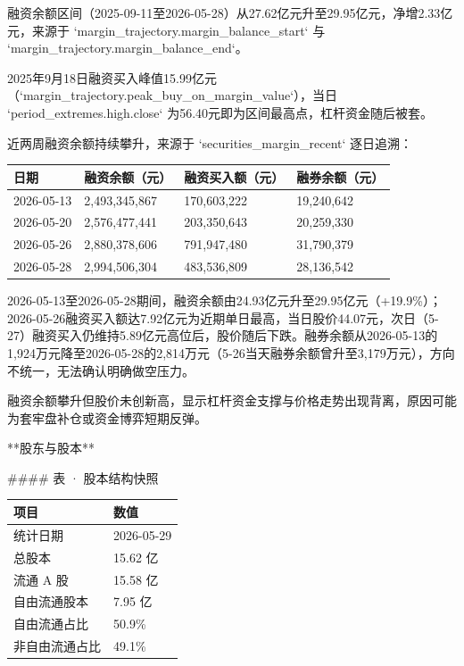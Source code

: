 \documentclass[12pt,a4paper]{article}
\begin{document}
融资余额区间（2025-09-11至2026-05-28）从27.62亿元升至29.95亿元，净增2.33亿元，来源于 `margin\_trajectory.margin\_balance\_start` 与 `margin\_trajectory.margin\_balance\_end`。

2025年9月18日融资买入峰值15.99亿元（`margin\_trajectory.peak\_buy\_on\_margin\_value`），当日 `period\_extremes.high.close` 为56.40元即为区间最高点，杠杆资金随后被套。

近两周融资余额持续攀升，来源于 `securities\_margin\_recent` 逐日追溯：

\begin{table}[htbp]
\centering
\begin{tabular}{llll}
\toprule
日期 & 融资余额（元） & 融资买入额（元） & 融券余额（元） \\
\midrule
2026-05-13 & 2,493,345,867 & 170,603,222 & 19,240,642 \\
2026-05-20 & 2,576,477,441 & 203,350,643 & 20,259,330 \\
2026-05-26 & 2,880,378,606 & 791,947,480 & 31,790,379 \\
2026-05-28 & 2,994,506,304 & 483,536,809 & 28,136,542 \\
\bottomrule
\end{tabular}
\end{table}


2026-05-13至2026-05-28期间，融资余额由24.93亿元升至29.95亿元（+19.9\%）；2026-05-26融资买入额达7.92亿元为近期单日最高，当日股价44.07元，次日（5-27）融资买入仍维持5.89亿元高位后，股价随后下跌。融券余额从2026-05-13的1,924万元降至2026-05-28的2,814万元（5-26当天融券余额曾升至3,179万元），方向不统一，无法确认明确做空压力。

融资余额攀升但股价未创新高，显示杠杆资金支撑与价格走势出现背离，原因可能为套牢盘补仓或资金博弈短期反弹。

**股东与股本**

\#\#\#\# 表 · 股本结构快照

\begin{table}[htbp]
\centering
\begin{tabular}{ll}
\toprule
项目 & 数值 \\
\midrule
统计日期 & 2026-05-29 \\
总股本 & 15.62 亿 \\
流通 A 股 & 15.58 亿 \\
自由流通股本 & 7.95 亿 \\
自由流通占比 & 50.9\% \\
非自由流通占比 & 49.1\% \\
\bottomrule
\end{tabular}
\end{table}
\end{document}
